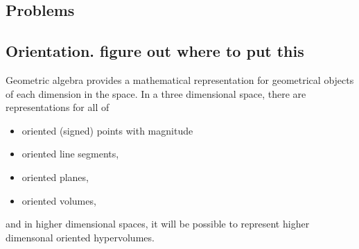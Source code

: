 \subsection{Problems}

\subsection{Orientation.  figure out where to put this}
Geometric algebra provides a mathematical representation for geometrical objects of each dimension in the space.
In a three dimensional space, there are representations for all of

\begin{itemize}
\item
oriented (signed) points with magnitude
\item
oriented line segments,
\item
oriented planes,
\item
oriented volumes,
\end{itemize}

and in higher dimensional spaces, it will be possible to represent higher dimensonal oriented hypervolumes.

